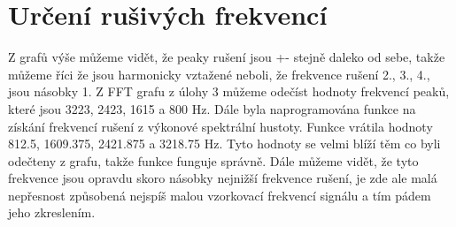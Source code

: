 \section{Určení rušivých frekvencí}
\label{sec:noise_freq}

Z grafů výše můžeme vidět, že peaky rušení jsou +- stejně daleko od sebe, takže můžeme říci že jsou harmonicky vztažené neboli, že frekvence rušení 2., 3., 4., jsou násobky 1.
Z FFT grafu z úlohy 3 můžeme odečíst hodnoty frekvencí peaků, které jsou 3223, 2423, 1615 a 800 Hz.
Dále byla naprogramována funkce na získání frekvencí rušení z výkonové spektrální hustoty.
Funkce vrátila hodnoty 812.5, 1609.375, 2421.875 a 3218.75 Hz.
Tyto hodnoty se velmi blíží těm co byli odečteny z grafu, takže funkce funguje správně.
Dále můžeme vidět, že tyto frekvence jsou opravdu skoro násobky nejnižší frekvence rušení, je zde ale malá nepřesnost způsobená nejspíš malou vzorkovací frekvencí signálu a tím pádem jeho zkreslením.